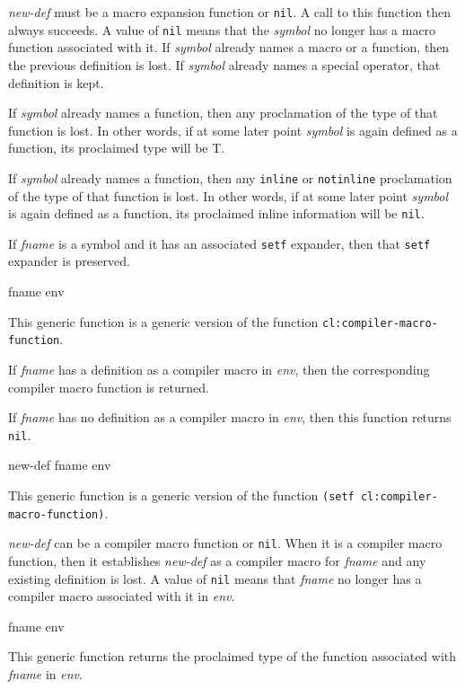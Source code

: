 \textit{new-def} must be a macro expansion function or \texttt{nil}.
A call to this function then always succeeds.  A value of \texttt{nil}
means that the \textit{symbol} no longer has a macro function
associated with it.  If \textit{symbol} already names a macro or a
function, then the previous definition is lost.  If \textit{symbol}
already names a special operator, that definition is kept.

If \textit{symbol} already names a function, then any proclamation of
the type of that function is lost.  In other words, if at some later
point \textit{symbol} is again defined as a function, its proclaimed
type will be T.

If \textit{symbol} already names a function, then any \texttt{inline} or
\texttt{notinline} proclamation of the type of that function is lost.  In other
words, if at some later point \textit{symbol} is again defined as a
function, its proclaimed inline information will be \texttt{nil}.

If \textit{fname} is a symbol and it has an associated \texttt{setf}
expander, then that \texttt{setf} expander is preserved.

 {fname env}

This generic function is a generic version of the \commonlisp{}
function \texttt{cl:compiler-macro-function}.

If \textit{fname} has a definition as a compiler macro in
\textit{env}, then the corresponding compiler macro function is
returned.

If \textit{fname} has no definition as a compiler macro in
\textit{env}, then this function returns \texttt{nil}.

 {new-def fname env}

This generic function is a generic version of the \commonlisp{}
function \texttt{(setf cl:compiler-macro-function)}.

\textit{new-def} can be a compiler macro function or \texttt{nil}.
When it is a compiler macro function, then it establishes
\textit{new-def} as a compiler macro for \textit{fname} and any
existing definition is lost.  A value of \texttt{nil} means that
\textit{fname} no longer has a compiler macro associated with it in
\textit{env}.

 {fname env}

This generic function returns the proclaimed type of the function
associated with \textit{fname} in \textit{env}.


